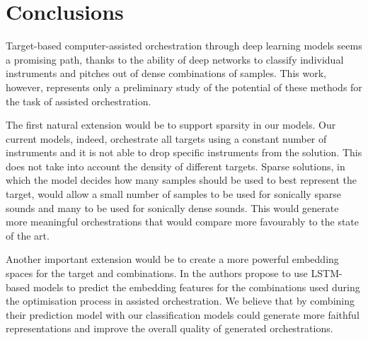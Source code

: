 \documentclass{article}
\begin{document}
\section{Conclusions}
\label{sec:conclusions}

Target-based computer-assisted orchestration through deep learning models seems a promising path, thanks to the ability of deep networks to classify individual instruments and pitches out of dense combinations of samples. This work, however, represents only a preliminary study of the potential of these methods for the task of assisted orchestration. 

The first natural extension would be to support sparsity in our models. Our current models, indeed, orchestrate all targets using a constant number of instruments and it is not able to drop specific instruments from the solution. This does not take into account the density of different targets. Sparse solutions, in which the model decides how many samples should be used to best represent the target, would allow a small number of samples to be used for sonically sparse sounds and many to be used for sonically dense sounds. This would generate more meaningful orchestrations that would compare more favourably to the state of the art.

Another important extension would be to create a more powerful embedding spaces for the target and combinations. In \cite{Gillick19} the authors propose to use LSTM-based models to predict the embedding features for the combinations used during the optimisation process in assisted orchestration. We believe that by combining their prediction model with our classification models could generate more faithful representations and improve the overall quality of generated orchestrations.
\end{document}
